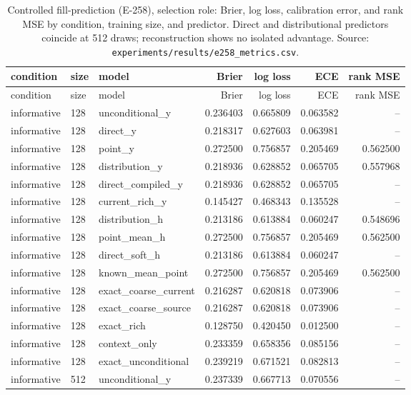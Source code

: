 \begin{longtable}{lllrrrr}
\caption{Controlled fill-prediction (E-258), selection role: Brier, log loss, calibration
error, and rank MSE by condition, training size, and predictor. Direct and distributional
predictors coincide at 512 draws; reconstruction shows no isolated advantage. Source:
\texttt{experiments/results/e258\_metrics.csv}.}
\label{tab:e258}\\
\toprule
condition & size & model & Brier & log loss & ECE & rank MSE \\
\midrule
\endfirsthead
\toprule
condition & size & model & Brier & log loss & ECE & rank MSE \\
\midrule
\endhead
\bottomrule
\endfoot
informative & 128 & unconditional\_y & 0.236403 & 0.665809 & 0.063582 & -- \\
informative & 128 & direct\_y & 0.218317 & 0.627603 & 0.063981 & -- \\
informative & 128 & point\_y & 0.272500 & 0.756857 & 0.205469 & 0.562500 \\
informative & 128 & distribution\_y & 0.218936 & 0.628852 & 0.065705 & 0.557968 \\
informative & 128 & direct\_compiled\_y & 0.218936 & 0.628852 & 0.065705 & -- \\
informative & 128 & current\_rich\_y & 0.145427 & 0.468343 & 0.135528 & -- \\
informative & 128 & distribution\_h & 0.213186 & 0.613884 & 0.060247 & 0.548696 \\
informative & 128 & point\_mean\_h & 0.272500 & 0.756857 & 0.205469 & 0.562500 \\
informative & 128 & direct\_soft\_h & 0.213186 & 0.613884 & 0.060247 & -- \\
informative & 128 & known\_mean\_point & 0.272500 & 0.756857 & 0.205469 & 0.562500 \\
informative & 128 & exact\_coarse\_current & 0.216287 & 0.620818 & 0.073906 & -- \\
informative & 128 & exact\_coarse\_source & 0.216287 & 0.620818 & 0.073906 & -- \\
informative & 128 & exact\_rich & 0.128750 & 0.420450 & 0.012500 & -- \\
informative & 128 & context\_only & 0.233359 & 0.658356 & 0.085156 & -- \\
informative & 128 & exact\_unconditional & 0.239219 & 0.671521 & 0.082813 & -- \\
informative & 512 & unconditional\_y & 0.237339 & 0.667713 & 0.070556 & -- \\

\end{longtable}
